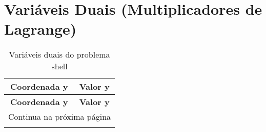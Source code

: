 \documentclass[12pt]{article}
\begin{document}
\section{Variáveis Duais (Multiplicadores de Lagrange)}

\begin{longtable}{@{}cc@{}}
\caption{Variáveis duais do problema shell} \\
\toprule
\textbf{Coordenada y} & \textbf{Valor y} \\
\midrule
\endfirsthead

\toprule
\textbf{Coordenada y} & \textbf{Valor y} \\
\midrule
\endhead

\midrule \multicolumn{2}{r}{{Continua na próxima página}} \\ \midrule
\endfoot


\end{longtable}
\end{document}
